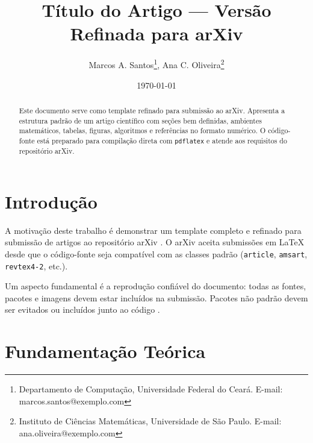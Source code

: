 \documentclass[12pt,a4paper]{article}
\theoremstyle{plain}
\theoremstyle{definition}
\theoremstyle{remark}
\begin{document}
\title{T\'itulo do Artigo --- Vers\~ao Refinada para arXiv}

\author{Marcos A. Santos\thanks{Departamento de Computa\c{c}\~ao, Universidade Federal
do Cear\'a. E-mail: marcos.santos@exemplo.com},
        Ana C. Oliveira\thanks{Instituto de Ci\^encias Matem\'aticas,
Universidade de S\~ao Paulo. E-mail: ana.oliveira@exemplo.com}}

\date{\today}

\maketitle

\begin{abstract}
Este documento serve como template refinado para submiss\~ao ao arXiv.
Apresenta a estrutura padr\~ao de um artigo cient\'ifico com se\c{c}\~oes
bem definidas, ambientes matem\'aticos, tabelas, figuras, algoritmos e
refer\^encias no formato num\'erico. O c\'odigo-fonte est\'a preparado para
compila\c{c}\~ao direta com \texttt{pdflatex} e atende aos requisitos do
reposit\'orio arXiv.
\end{abstract}

\section{Introdu\c{c}\~ao}
\label{sec:intro}

A motiva\c{c}\~ao deste trabalho \'e demonstrar um template completo e
refinado para submiss\~ao de artigos ao reposit\'orio arXiv
\cite{arXiv2024Guide}. O arXiv aceita submiss\~oes em \LaTeX
desde que o c\'odigo-fonte seja compat\'ivel com as classes padr\~ao
(\texttt{article}, \texttt{amsart}, \texttt{revtex4-2}, etc.).

Um aspecto fundamental \'e a reprodu\c{c}\~ao confi\'avel do documento:
todas as fontes, pacotes e imagens devem estar inclu\'idos na submiss\~ao.
Pacotes n\~ao padr\~ao devem ser evitados ou inclu\'idos junto ao c\'odigo
\cite{arXivSubmitFAQ}.

\section{Fundamenta\c{c}\~ao Te\'orica}
\label{sec:fund}
\end{document}
